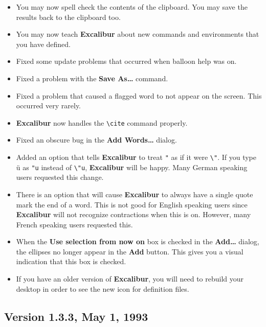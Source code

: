 ﻿\documentclass[11pt,titlepage]{article}
\newcommand{\ex}{\textbf{Excalibur}}
\begin{document}
\begin{itemize}

\item You may now spell check the contents of the clipboard.  You may
  save the results back to the clipboard too.

\item You may now teach \ex{} about new commands and environments that
  you have defined.

\item Fixed some update problems that occurred when balloon help was
  on.

\item Fixed a problem with the \textbf{Save As\ldots} command.

\item Fixed a problem that caused a flagged word to not appear on the
  screen.  This occurred very rarely.

\item \ex{} now handles the \verb+\cite+ command properly.

\item Fixed an obscure bug in the \textbf{Add Words\ldots} dialog.

\item Added an option that tells \ex{} to treat \texttt{"} as if it
  were \verb+\"+.  If you type \"u as \verb+"u+ instead of \verb+\"u+,
  \ex{} will be happy.  Many German speaking users requested this
  change.

\item There is an option that will cause \ex{} to always have a single
  quote mark the end of a word.  This is not good for English speaking
  users since \ex{} will not recognize contractions when this is on.
  However, many French speaking users requested this.

\item When the \textbf{Use selection from now on} box is checked in
  the \textbf{Add\ldots} dialog, the ellipses no longer appear in
  the \textbf{Add} button.  This gives you a visual indication that
  this box is checked.

\item If you have an older version of \ex{}, you will need to
  rebuild your desktop in order to see the new icon for definition
  files.
\end{itemize}

\subsection{Version 1.3.3, May 1, 1993}
\end{document}

